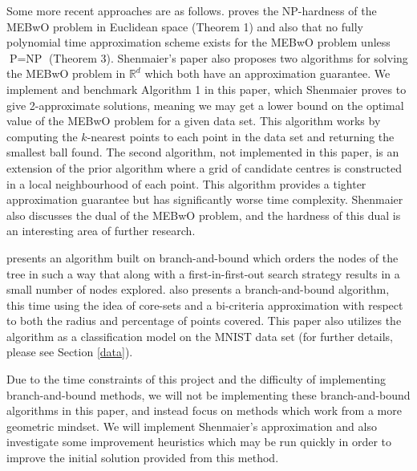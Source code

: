 \documentclass[11pt,twoside]{report}
\theoremstyle{definition}
\numberwithin{theorem}{section}
\numberwithin{definition}{section}
\numberwithin{lemma}{section}
\numberwithin{proposition}{section}
\numberwithin{equation}{section}
\numberwithin{figure}{section}
\begin{document}
Some more recent approaches are as follows. \cite{SHENMAIER201581} proves the NP-hardness of the MEBwO problem in Euclidean space (Theorem 1) and also that no fully polynomial time approximation scheme exists for the MEBwO problem unless $\text{P}=\text{NP}$ (Theorem 3). Shenmaier's paper also proposes two algorithms for solving the MEBwO problem in $\mathbb{R}^d$ which both have an approximation guarantee. We implement and benchmark Algorithm 1 in this paper, which Shenmaier proves to give 2-approximate solutions, meaning we may get a lower bound on the optimal value of the MEBwO problem for a given data set. This algorithm works by computing the $k$-nearest points to each point in the data set and returning the smallest ball found. The second algorithm, not implemented in this paper, is an extension of the prior algorithm where a grid of candidate centres is constructed in a local neighbourhood of each point. This algorithm provides a tighter approximation guarantee but has significantly worse time complexity. Shenmaier also discusses the dual of the MEBwO problem, and the hardness of this dual is an interesting area of further research.

\cite{cavaleiro} presents an algorithm built on branch-and-bound \cite{bnb} which orders the nodes of the tree in such a way that along with a first-in-first-out search strategy results in a small number of nodes explored. \cite{huding} also presents a branch-and-bound algorithm, this time using the idea of core-sets and a bi-criteria approximation with respect to both the radius and percentage of points covered. This paper also utilizes the algorithm as a classification model on the MNIST \cite{lecun2010mnist} data set (for further details, please see Section \ref{data}).

Due to the time constraints of this project and the difficulty of implementing branch-and-bound methods, we will not be implementing these branch-and-bound algorithms in this paper, and instead focus on methods which work from a more geometric mindset. We will implement Shenmaier's approximation and also investigate some improvement heuristics which may be run quickly in order to improve the initial solution provided from this method.








\end{document}
